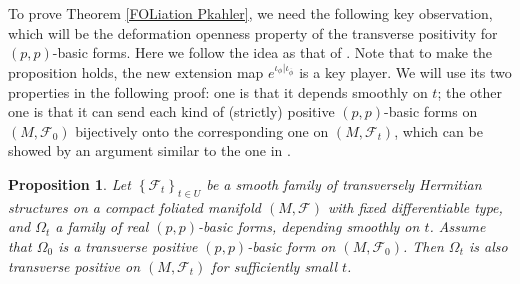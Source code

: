 \documentclass[12pt]{amsart}
\numberwithin{equation}{section}
\newtheorem{proposition}[theorem]{Proposition}
\theoremstyle{definition}
\theoremstyle{definition}
\theoremstyle{definition}
\renewcommand{\1}{\mathsf{1}}
\renewcommand{\>}{\rightarrow}
\def\mc{\mathcal}
\theoremstyle{plain} %
\theoremstyle{plain} %
\theoremstyle{plain} %
\begin{document}
	To prove Theorem \ref{FOLiation Pkahler}, we  need the following key observation, which will be the  deformation openness property of the transverse  positivity for $(p,p)$-basic forms. Here we follow the idea as that of \cite[the second proof of Theorem 4.9]{RWZ21}. %
	Note that to make the proposition holds, the new extension map $e^{\iota_{\phi}|\iota_{\overline{\phi}}}$ is a key player. We will use its two properties in the following  proof:  one is that it depends smoothly on $t$; the other one is that  it can send each kind of  (strictly) positive  $(p,p)$-basic forms on $(M,\mathcal F_0)$ bijectively onto the corresponding one on $(M,\mc F_t)$, which can be showed by an argument similar to the one in \cite[Proposition 4.11]{RWZ19}.
	\begin{proposition}
		Let $\left\{\mc F_t\right\}_{t\in U}$ be a smooth family of transversely Hermitian structures on a compact  foliated manifold $(M,\mc F)$ with fixed differentiable type, and $\Omega_t$ a family of real $(p,p)$-basic forms, depending smoothly on $t$.  Assume that $\Omega_0$ is a  transverse positive $(p,p)$-basic form on $(M,\mc F_0)$. Then $\Omega_t$ is also  transverse positive on $(M,\mc F_t)$ for sufficiently small $t$.
	\end{proposition}
\end{document}
